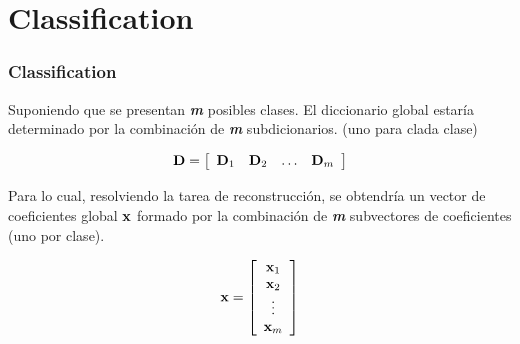 \documentclass[spanish,xcolor=dvipsnames]{beamer}
\begin{document}


\section {Classification}
\begin {frame}
	\frametitle {Classification}

Suponiendo que se presentan \textit {\textbf{m}} posibles clases.
El diccionario global estaría determinado por la combinación de \textit {\textbf{m}} subdicionarios. 
(uno para clada clase)

	\begin{equation}
		\nonumber {\bf D}=\left[ \begin{array}{cccc} {\bf D}_1 & {\bf D}_2 & \ldots & {\bf D}_m \end{array} \right]
	\end{equation}

Para lo cual, resolviendo la tarea de reconstrucción, se obtendría un vector de coeficientes global ${\bf x}$ formado por la combinación de \textit {\textbf{m}} subvectores de coeficientes (uno por clase).

	\begin{equation}
		\nonumber {\bf x}=\left[ \begin{array}{c} {\bf x}_1 \\ {\bf x}_2 \\  \vdots \\ {\bf x}_m \end{array} \right]
	\end{equation}

\end{frame}
\end{document}
